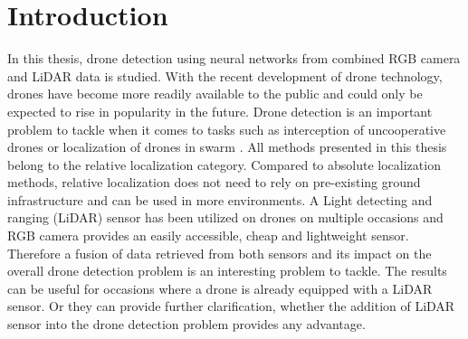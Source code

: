 \documentclass[twoside]{ctuthesis}
\theoremstyle{plain}
\theoremstyle{definition}
\theoremstyle{note}
\begin{document}
\maketitle
\chapter{Introduction}
In this thesis, drone detection using neural networks from combined RGB camera and LiDAR data is studied. With the recent development of drone technology, drones have become more readily available to the public and could only be expected to rise in popularity in the future. Drone detection is an important problem to tackle when it comes to tasks such as interception of uncooperative drones \cite{cite:1} or localization of drones in swarm \cite{cite:2} \cite{cite:3}. All methods presented in this thesis belong to the relative localization category. Compared to absolute localization methods, relative localization does not need to rely on pre-existing ground infrastructure and can be used in more environments. A Light detecting and ranging (LiDAR) sensor has been utilized on drones on multiple occasions \cite{cite:4} \cite{9553611} \cite{9554023} and RGB camera provides an easily accessible, cheap and lightweight sensor. Therefore a fusion of data retrieved from both sensors and its impact on the overall drone detection problem is an interesting problem to tackle. The results can be useful for occasions where a drone is already equipped with a LiDAR sensor. Or they can provide further clarification, whether the addition of LiDAR sensor into the drone detection problem provides any advantage.
\end{document}
